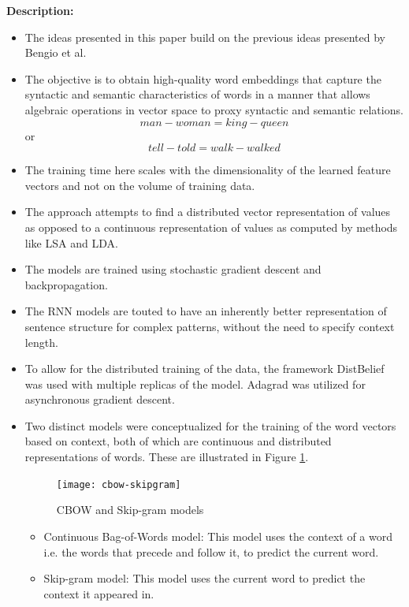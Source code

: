 \documentclass[11pt,a4paper]{article}
\begin{document}
  \textbf{Description:}
  \begin{itemize}
    \item
    The ideas presented in this paper build on the previous ideas presented by Bengio et al.\cite{bengio2003neural}
    \item
    The objective is to obtain high-quality word embeddings that capture the syntactic and semantic characteristics of words in a manner that allows algebraic operations in vector space to proxy syntactic and semantic relations.
    $$man - woman = king - queen$$ or $$tell - told = walk - walked$$
    \item
    The training time here scales with the dimensionality of the learned feature vectors and not on the volume of training data.
    \item
    The approach attempts to find a distributed vector representation of values as opposed to a continuous representation of values as computed by methods like LSA and LDA.
    \item
    The models are trained using stochastic gradient descent and backpropagation.
    \item
    The RNN models are touted to have an inherently better representation of sentence structure for complex patterns, without the need to specify context length.
    \item
    To allow for the distributed training of the data, the framework DistBelief was used with multiple replicas of the model. Adagrad was utilized for asynchronous gradient descent.
    \item
    Two distinct models were conceptualized for the training of the word vectors based on context, both of which are continuous and distributed representations of words. These are illustrated in Figure \ref{fig:cbow-skipgram}.
    \begin{figure}[ht]
      \centering
      \texttt{[image: cbow-skipgram]}
      \caption{CBOW and Skip-gram models}
      \label{fig:cbow-skipgram}
    \end{figure}
    \begin{itemize}
      \item
      Continuous Bag-of-Words model: This model uses the context of a word i.e. the words that precede and follow it, to predict the current word.
      \item
      Skip-gram model: This model uses the current word to predict the context it appeared in.
    \end{itemize}
  \end{itemize}
\end{document}
